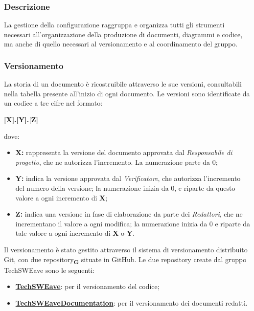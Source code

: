 \subsubsection{Descrizione}
La gestione della configurazione raggruppa e organizza tutti gli strumenti necessari all'organizzazione della produzione di documenti, diagrammi e codice, ma anche di quello necessari al versionamento e al coordinamento del gruppo.
\subsubsection{Versionamento}
La storia di un documento è ricostruibile attraverso le sue versioni, consultabili nella tabella presente all'inizio di ogni documento. Le versioni sono identificate da un codice a tre cifre nel formato:
\begin{center}
    \textbf{\large [X].[Y].[Z]}\\
\end{center}
dove:
\begin{itemize}
    \item \textbf{\large X:} rappresenta la versione del documento approvata dal \textit{Responsabile di progetto}, che ne autorizza l'incremento. La numerazione parte da 0;
    \item \textbf{\large Y:} indica la versione approvata dal \textit{Verificatore}, che autorizza l'incremento del numero della versione; la numerazione inizia da 0, e riparte da questo valore a ogni incremento di \textbf{X};
    \item \textbf{\large Z:} indica una versione in fase di elaborazione da parte dei \textit{Redattori}, che ne incrementano il valore a ogni modifica; la numerazione inizia da 0 e riparte da tale valore a ogni incremento di \textbf{X} o \textbf{Y}.
\end{itemize}
Il versionamento è stato gestito attraverso il sistema di versionamento distribuito Git, con due repository\textsubscript{\textbf{G}} situate in GitHub.
Le due repository create dal gruppo TechSWEave sono le seguenti:
\begin{itemize}
    \item \textbf{\href{https://github.com/techsweave/TechSWEave.git}{TechSWEave}}: per il versionamento del codice;
    \item \textbf{\href{https://github.com/techsweave/TechSWEaveDocumentation.git}{TechSWEaveDocumentation}}: per il versionamento dei documenti redatti.
\end{itemize}
